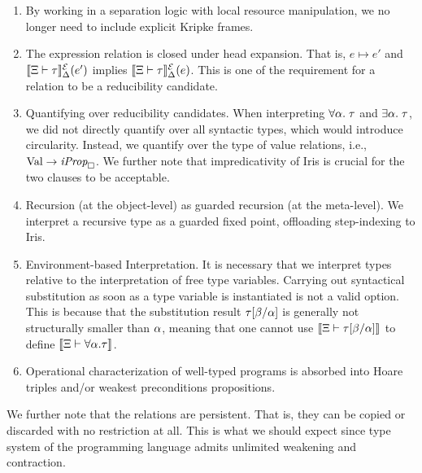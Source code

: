 \documentclass{article}
\theoremstyle{definition}
\theoremstyle{plain}
\theoremstyle{remark}
\newcommand{\redu}{\mapsto}
\begin{document}
\begin{enumerate}
  \item By working in a separation logic with local resource manipulation, we no longer need to include explicit Kripke frames.
  \item The expression relation is closed under head expansion. That is, \(e\redu e'\) and \(\llbracket \Xi \vdash \tau \rrbracket^{\mathcal{E}}_{\Delta}(e')\) implies \(\llbracket \Xi \vdash \tau \rrbracket^{\mathcal{E}}_{\Delta}(e)\).
    This is one of the requirement for a relation to be a reducibility candidate.
  \item Quantifying over reducibility candidates.
    When interpreting \(\forall \alpha.\; \tau\) and \(\exists \alpha.\; \tau\), we did not directly quantify over all syntactic types, which would introduce circularity.
    Instead, we quantify over the type of value relations, i.e., \(\mathrm{Val} \to \textit{iProp}_{\mathop{\Box}}\).
    We further note that impredicativity of Iris is crucial for the two clauses to be acceptable.
  \item Recursion (at the object-level) as guarded recursion (at the meta-level).
    We interpret a recursive type as a guarded fixed point, offloading step-indexing to Iris.
  \item Environment-based Interpretation.
    It is necessary that we interpret types relative to the interpretation of free type variables.
    Carrying out syntactical substitution as soon as a type variable is instantiated is not a valid option.
    This is because that the substitution result \({\tau}[{\beta} / {\alpha}]\) is generally not structurally smaller than \(\alpha\),
    meaning that one cannot use \(\llbracket \Xi \vdash {\tau}[{\beta} / {\alpha}] \rrbracket_{}\) to define \(\llbracket \Xi \vdash \forall \alpha . \tau \rrbracket_{}\).
  \item Operational characterization of well-typed programs is absorbed into Hoare triples and/or weakest preconditions propositions.
\end{enumerate}
We further note that the relations are persistent. That is, they can be copied or discarded with no restriction at all.
This is what we should expect since type system of the programming language admits unlimited weakening and contraction.\par
\end{document}

